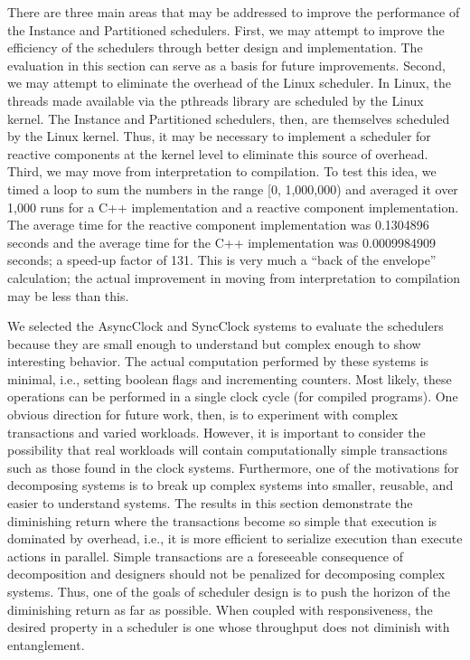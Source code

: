 There are three main areas that may be addressed to improve the performance of the Instance and Partitioned schedulers.
First, we may attempt to improve the efficiency of the schedulers through better design and implementation.
The evaluation in this section can serve as a basis for future improvements.
Second, we may attempt to eliminate the overhead of the Linux scheduler.
In Linux, the threads made available via the pthreads library are scheduled by the Linux kernel.
The Instance and Partitioned schedulers, then, are themselves scheduled by the Linux kernel.
Thus, it may be necessary to implement a scheduler for reactive components at the kernel level to eliminate this source of overhead.
Third, we may move from interpretation to compilation.
To test this idea, we timed a loop to sum the numbers in the range [0, 1,000,000) and averaged it over 1,000 runs for a C++ implementation and a reactive component implementation.
The average time for the reactive component implementation was 0.1304896 seconds and the average time for the C++ implementation was 0.0009984909 seconds; a speed-up factor of 131.
This is very much a ``back of the envelope'' calculation; the actual improvement in moving from interpretation to compilation may be less than this.

We selected the AsyncClock and SyncClock systems to evaluate the schedulers because they are small enough to understand but complex enough to show interesting behavior.
The actual computation performed by these systems is minimal, i.e., setting boolean flags and incrementing counters.
Most likely, these operations can be performed in a single clock cycle (for compiled programs).
One obvious direction for future work, then, is to experiment with complex transactions and varied workloads.
However, it is important to consider the possibility that real workloads will contain computationally simple transactions such as those found in the clock systems.
Furthermore, one of the motivations for decomposing systems is to break up complex systems into smaller, reusable, and easier to understand systems.
The results in this section demonstrate the diminishing return where the transactions become so simple that execution is dominated by overhead, i.e., it is more efficient to serialize execution than execute actions in parallel.
Simple transactions are a foreseeable consequence of decomposition and designers should not be penalized for decomposing complex systems.
Thus, one of the goals of scheduler design is to push the horizon of the diminishing return as far as possible.
When coupled with responsiveness, the desired property in a scheduler is one whose throughput does not diminish with entanglement.

